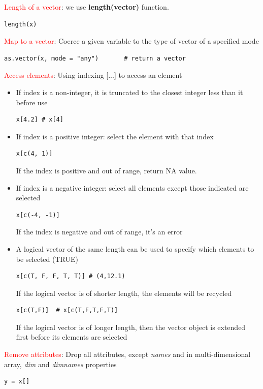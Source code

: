 \textcolor{red}{Length of a vector}: we use {\bf length(vector)}
function. 

\begin{lstlisting}
length(x)
\end{lstlisting}


\textcolor{red}{Map to a vector}: Coerce a given variable to the type
of vector of a specified mode
\begin{lstlisting}
as.vector(x, mode = "any")       # return a vector
\end{lstlisting}

\textcolor{red}{Access elements}: Using indexing [...] to access an
element

\begin{itemize}
\item If index is a non-integer, it is truncated to the closest
  integer less than it before use
\begin{lstlisting}
x[4.2] # x[4]
\end{lstlisting}

\item If index is a positive integer: select the element with that
  index
\begin{lstlisting}
x[c(4, 1)] 
\end{lstlisting}
If the index is positive and out of range, return NA value.

\item If index is a negative integer: select all elements except those
  indicated are selected
\begin{lstlisting}
x[c(-4, -1)] 
\end{lstlisting}
If the index is negative and out of range, it's an error

\item A logical vector of the same length can be used to specify which
  elements to be selected (TRUE)
\begin{lstlisting}
x[c(T, F, F, T, T)] # (4,12.1)
\end{lstlisting}
  If the logical vector is of shorter length, the elements will be
  recycled
\begin{lstlisting}
x[c(T,F)]  # x[c(T,F,T,F,T)]
\end{lstlisting}
  If the logical vector is of longer length, then the vector object is
  extended first before its elements are selected
\end{itemize}

\textcolor{red}{Remove attributes}: Drop all attributes, except
{\it names} and in multi-dimensional array, {\it dim} and
{\it dimnames} properties
\begin{lstlisting}
y = x[]
\end{lstlisting}


